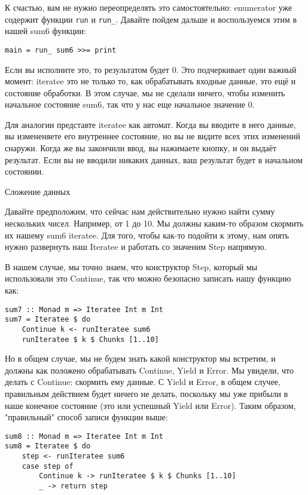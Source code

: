 К счастью, вам не нужно переопределять это самостоятельно: enumerator уже содержит функции \lstinline'run' и \lstinline'run_'. Давайте пойдем дальше и воспользуемся этим в нашей sum6 функции:

\begin{lstlisting}
main = run_ sum6 >>= print
\end{lstlisting}

Если вы исполните это, то результатом будет 0. Это подчеркивает один важный момент: iteratee это не только то, как обрабатывать входные данные, это ещё и состояние обработки. В этом случае, мы не сделали ничего, чтобы изменить начальное состояние sum6, так что у нас еще начальное значение 0.

Для аналогии представте iteratee как автомат. Когда вы вводите в него данные, вы измененяете его внутреннее состояние, но вы не видите всех этих изменений снаружи. Когда же вы закончили ввод, вы нажимаете кнопку, и он выдаёт результат. Если вы не вводили никаких данных, ваш результат будет в начальном состоянии.

Сложение данных

Давайте предположим, что сейчас нам действительно нужно найти сумму нескольких чисел. Например, от 1 до 10. Мы должны каким-то образом скормить их нашему sum6 iteratee. Для того, чтобы как-то подойти к этому, нам опять нужно развернуть наш Iteratee и работать со значеним Step напрямую.

В нашем случае, мы точно знаем, что конструктор Step, который мы использовали это Continue, так что можно безопасно записать нашу функцию как:

\begin{lstlisting}
sum7 :: Monad m => Iteratee Int m Int
sum7 = Iteratee $ do
    Continue k <- runIteratee sum6
    runIteratee $ k $ Chunks [1..10]
\end{lstlisting}

Но в общем случае, мы не будем знать какой конструктор мы встретим, и должны как положено обрабатывать Continue, Yield и Error. Мы увидели, что делать с Continue: скормить ему данные. С Yield и Error, в общем случее, правильным действием будет ничего не делать, поскольку мы уже прибыли в наше конечное состояние (это или успешный Yield или Error). Таким образом, "правильный" способ записи функции выше:

\begin{lstlisting}
sum8 :: Monad m => Iteratee Int m Int
sum8 = Iteratee $ do
    step <- runIteratee sum6
    case step of
        Continue k -> runIteratee $ k $ Chunks [1..10]
        _ -> return step
\end{lstlisting}


